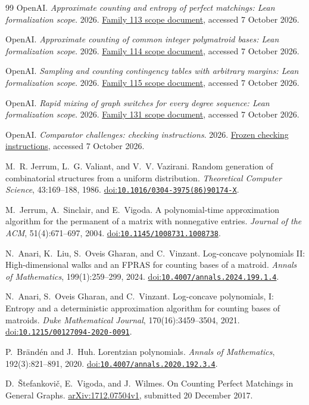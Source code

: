 \documentclass[11pt]{article}
\newcommand{\repourl}[2]{\href{https://github.com/openai/math/blob/adc7f1241b42e322a6451854ab7e4b4c146bf78a/#1}{#2}}
\newcommand{\doi}[1]{\href{https://doi.org/#1}{doi:\nolinkurl{#1}}}
\begin{document}
\begin{thebibliography}{99}
OpenAI.
\emph{Approximate counting and entropy of perfect matchings: Lean formalization scope}.
2026.
\repourl{lean/docs/113.md}{Family 113 scope document}, accessed 7 October 2026.

OpenAI.
\emph{Approximate counting of common integer polymatroid bases: Lean formalization scope}.
2026.
\repourl{lean/docs/114.md}{Family 114 scope document}, accessed 7 October 2026.

OpenAI.
\emph{Sampling and counting contingency tables with arbitrary margins: Lean formalization scope}.
2026.
\repourl{lean/docs/115.md}{Family 115 scope document}, accessed 7 October 2026.

OpenAI.
\emph{Rapid mixing of graph switches for every degree sequence: Lean formalization scope}.
2026.
\repourl{lean/docs/131.md}{Family 131 scope document}, accessed 7 October 2026.

OpenAI.
\emph{Comparator challenges: checking instructions}.
2026.
\repourl{lean/ComparatorChallenges/README.md}{Frozen checking instructions}, accessed 7 October 2026.

M.~R. Jerrum, L.~G. Valiant, and V.~V. Vazirani.
Random generation of combinatorial structures from a uniform distribution.
\emph{Theoretical Computer Science}, 43:169--188, 1986.
\doi{10.1016/0304-3975(86)90174-X}.

M.~Jerrum, A.~Sinclair, and E.~Vigoda.
A polynomial-time approximation algorithm for the permanent of a matrix with nonnegative entries.
\emph{Journal of the ACM}, 51(4):671--697, 2004.
\doi{10.1145/1008731.1008738}.

N.~Anari, K.~Liu, S.~Oveis Gharan, and C.~Vinzant.
Log-concave polynomials II: High-dimensional walks and an FPRAS for counting bases of a matroid.
\emph{Annals of Mathematics}, 199(1):259--299, 2024.
\doi{10.4007/annals.2024.199.1.4}.

N.~Anari, S.~Oveis Gharan, and C.~Vinzant.
Log-concave polynomials, I: Entropy and a deterministic approximation algorithm for counting bases of matroids.
\emph{Duke Mathematical Journal}, 170(16):3459--3504, 2021.
\doi{10.1215/00127094-2020-0091}.

P.~Br\"and\'en and J.~Huh.
Lorentzian polynomials.
\emph{Annals of Mathematics}, 192(3):821--891, 2020.
\doi{10.4007/annals.2020.192.3.4}.

D.~\v{S}tefankovi\v{c}, E.~Vigoda, and J.~Wilmes.
On Counting Perfect Matchings in General Graphs.
\href{https://arxiv.org/abs/1712.07504v1}{arXiv:1712.07504v1}, submitted 20 December 2017.


\end{thebibliography}
\end{document}

